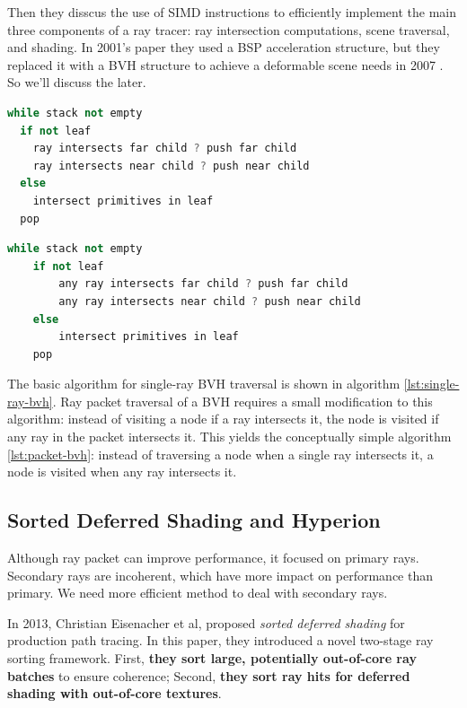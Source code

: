 Then they disscus the use of SIMD instructions to efficiently implement the main three components of a ray tracer: ray intersection computations, scene traversal, and shading. In 2001's paper they used a BSP acceleration structure, but they replaced it with a BVH structure to achieve a deformable scene needs in 2007 \cite{a:RayTracingDeformableScenesUsingDynamicBoundingVolumeHierarchies}. So we'll discuss the later.  

\begin{lstlisting}[language=C++,caption=A typical inner loop for BVH traversal,label=lst:single-ray-bvh]
while stack not empty
  if not leaf
    ray intersects far child ? push far child 
    ray intersects near child ? push near child
  else
    intersect primitives in leaf
  pop
\end{lstlisting}

\begin{lstlisting}[language=C++,caption=Basic ray packet traversal for a BVH,label=lst:packet-bvh]
while stack not empty
	if not leaf
		any ray intersects far child ? push far child 
		any ray intersects near child ? push near child
	else
		intersect primitives in leaf
	pop
\end{lstlisting}

The basic algorithm for single-ray BVH traversal is shown in algorithm \ref{lst:single-ray-bvh}. Ray packet traversal of a BVH requires a small modification to this algorithm: instead of visiting a node if a ray intersects it, the node is visited if any ray in the packet intersects it. This yields the conceptually simple algorithm \ref{lst:packet-bvh}: instead of traversing a node when a single ray intersects it, a node is visited when any ray intersects it.



\subsection{Sorted Deferred Shading and Hyperion} 
Although ray packet can improve performance, it focused on primary rays. Secondary rays are incoherent, which have more impact on performance than primary. We need more efficient method to deal with secondary rays.

In 2013, Christian Eisenacher et al, proposed \textit{sorted deferred shading}\cite{a:SortedDeferredShadingforProductionPathTracing} for production path tracing. In this paper, they introduced a novel two-stage ray sorting framework. First, \textbf{they sort large, potentially out-of-core ray batches} to ensure coherence; Second, \textbf{they sort ray hits for deferred shading with out-of-core textures}.

